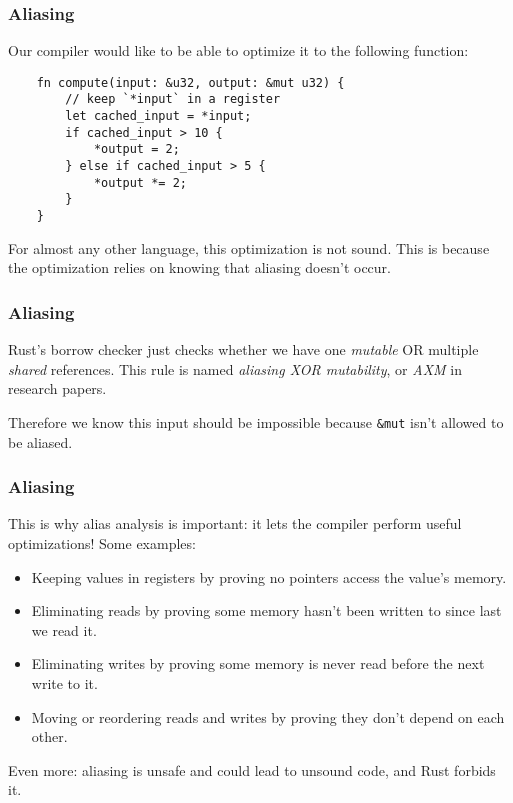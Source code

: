 \documentclass[aspectratio=1610,t]{beamer}
\begin{document}

\begin{frame}[fragile]
\frametitle{Aliasing}
Our compiler would like to be able to optimize it to the following function:

\begin{verbatim}
    fn compute(input: &u32, output: &mut u32) {
        // keep `*input` in a register
        let cached_input = *input;
        if cached_input > 10 {
            *output = 2;
        } else if cached_input > 5 {
            *output *= 2;
        }
    }
\end{verbatim}

For almost any other language, this optimization is not sound. This is because the optimization relies on knowing that aliasing doesn't occur.
\end{frame}


\begin{frame}[fragile]
\frametitle{Aliasing}
Rust's borrow checker just checks whether we have one \textit{mutable} OR multiple \textit{shared} references. This rule is named \textit{aliasing XOR mutability}, or \textit{AXM} in research papers.

Therefore we know this input should be impossible because \texttt{\&mut} isn't allowed to be aliased.
\end{frame}


\begin{frame}[fragile]
\frametitle{Aliasing}
This is why alias analysis is important: it lets the compiler perform useful optimizations! Some examples:

\begin{itemize}
    \item Keeping values in registers by proving no pointers access the value's memory.
    \item Eliminating reads by proving some memory hasn't been written to since last we read it.
    \item Eliminating writes by proving some memory is never read before the next write to it.
    \item Moving or reordering reads and writes by proving they don't depend on each other.
\end{itemize}

Even more: aliasing is unsafe and could lead to unsound code, and Rust forbids it.
\end{frame}
\end{document}
